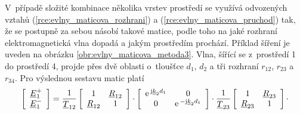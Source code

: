 V~případě složité kombinace několika vrstev prostředí se využívá odvozených vztahů (\ref{rce:evlny_maticova_rozhrani}) a (\ref{rce:evlny_maticova_pruchod}) tak, že se postupně za sebou násobí takové matice, podle toho na jaké rozhraní elektromagnetická vlna dopadá a jakým prostředím prochází. Příklad šíření je uveden na obrázku \ref{obr:evlny_maticova_metoda3}. Vlna, šířící se z~prostředí 1 do prostředí 4, projde přes dvě oblasti o~tloušťce $d_{1}$, $d_{2}$ a tři rozhraní $r_{12}$, $r_{23}$ a $r_{34}$. Pro výslednou sestavu matic platí 
\begin{displaymath}
\left[ \begin{array}{c}
{\underline{E}}_{1}^{+} \\
{\underline{E}}_{1}^{-} \\
\end{array} \right]
=
\frac{1}{{\underline{T}}_ {12}}
\left[ \begin{array}{cc}
1 & {\underline{R}}_{12} \\
{\underline{R}}_{12} & 1 \\
\end{array} \right]
\cdot
\left[ \begin{array}{cc}
\mathrm{e\,}^{\mathrm{j}{\underline{k}}_{2} d_{1}} & 0 \\
0 & \mathrm{e\,}^{-\mathrm{j}{\underline{k}}_{2} d_{1}} \\
\end{array} \right]
\cdot
\frac{1}{{\underline{T}}_ {23}}
\left[ \begin{array}{cc}
1 & {\underline{R}}_{23} \\
{\underline{R}}_{23} & 1 \\
\end{array} \right]
\cdot
\end{displaymath}

